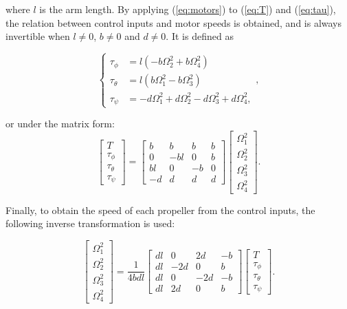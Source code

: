 \noindent where $l$ is the arm length. By applying (\ref{eq:motors}) to
(\ref{eq:T}) and (\ref{eq:tau}), the relation between control inputs and motor
speeds is obtained, and is always invertible when $l \neq 0$, $b \neq 0$ and
$d \neq 0$. It is defined as

\begin{equation}
  \begin{cases}
    \tau_{\phi} &= l (-b\Omega_2^2 + b\Omega_4^2) \\
    \tau_{\theta} &= l (b\Omega_1^2 - b\Omega_3^2) \\
    \tau_{\psi} &= -d\Omega_1^2 + d\Omega_2^2 - d\Omega_3^2 + d\Omega_4^2,
  \end{cases},
  \label{eq:tau}
\end{equation}

or under the matrix form:
\begin{equation}
  \begin{bmatrix}
    T \\
    \tau_{\phi} \\
    \tau_{\theta} \\
    \tau_{\psi}
  \end{bmatrix} = \begin{bmatrix}
    b & b & b & b\\
    0 & -bl & 0 & b\\
    bl & 0 & -b & 0\\
    -d & d & d & d
  \end{bmatrix}
  \begin{bmatrix}
    \Omega_1^2\\
    \Omega_2^2\\
    \Omega_3^2\\
    \Omega_4^2
  \end{bmatrix}.
  \label{eq:motor_speed}
\end{equation}

Finally, to obtain the speed of each propeller from the control inputs, the
following inverse transformation is used:

\begin{equation}
  \begin{bmatrix}
    \Omega_1^2 \\ \Omega_2^2 \\ \Omega_3^2 \\ \Omega_4^2
  \end{bmatrix} = \frac{1}{4 b d l} \begin{bmatrix}
    dl & 0 & 2d & -b\\
    dl & -2d & 0 & b\\
    dl & 0 & -2d & -b\\
    dl & 2d & 0 & b 
  \end{bmatrix}
  \begin{bmatrix}
    T\\
    \tau_{\phi}\\
    \tau_{\theta}\\
    \tau_{\psi}
  \end{bmatrix}.
  \label{eq:motor_speed}
\end{equation}

